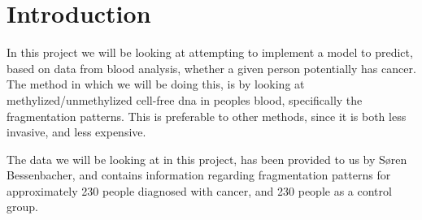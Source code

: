 \chapter{Introduction}
In this project we will be looking at attempting to implement a model to predict, based on data from blood analysis, whether a given person potentially has cancer.
The method in which we will be doing this, is by looking at methylized/unmethylized cell-free dna in peoples blood, specifically the fragmentation patterns.
This is preferable to other methods, since it is both less invasive, and less expensive.

The data we will be looking at in this project, has been provided to us by Søren Bessenbacher, and contains information regarding fragmentation patterns for approximately 230 people diagnosed with cancer, and 230 people as a control group.
